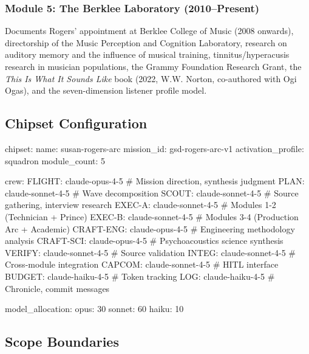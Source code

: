 \documentclass[11pt,letterpaper]{article}
\begin{document}
\subsubsection{Module 5: The Berklee Laboratory (2010--Present)}
Documents Rogers' appointment at Berklee College of Music (2008 onwards), directorship of the Music Perception and Cognition Laboratory, research on auditory memory and the influence of musical training, tinnitus/hyperacusis research in musician populations, the Grammy Foundation Research Grant, the \textit{This Is What It Sounds Like} book (2022, W.W. Norton, co-authored with Ogi Ogas), and the seven-dimension listener profile model.

\subsection{Chipset Configuration}

\begin{asciibox}
chipset:
  name: susan-rogers-arc
  mission_id: gsd-rogers-arc-v1
  activation_profile: squadron
  module_count: 5

  crew:
    FLIGHT: claude-opus-4-5   # Mission direction, synthesis judgment
    PLAN: claude-sonnet-4-5   # Wave decomposition
    SCOUT: claude-sonnet-4-5  # Source gathering, interview research
    EXEC-A: claude-sonnet-4-5 # Modules 1-2 (Technician + Prince)
    EXEC-B: claude-sonnet-4-5 # Modules 3-4 (Production Arc + Academic)
    CRAFT-ENG: claude-opus-4-5   # Engineering methodology analysis
    CRAFT-SCI: claude-opus-4-5   # Psychoacoustics science synthesis
    VERIFY: claude-sonnet-4-5    # Source validation
    INTEG: claude-sonnet-4-5     # Cross-module integration
    CAPCOM: claude-sonnet-4-5    # HITL interface
    BUDGET: claude-haiku-4-5     # Token tracking
    LOG: claude-haiku-4-5        # Chronicle, commit messages

  model_allocation:
    opus: 30%
    sonnet: 60%
    haiku: 10%
\end{asciibox}

\subsection{Scope Boundaries}
\end{document}
